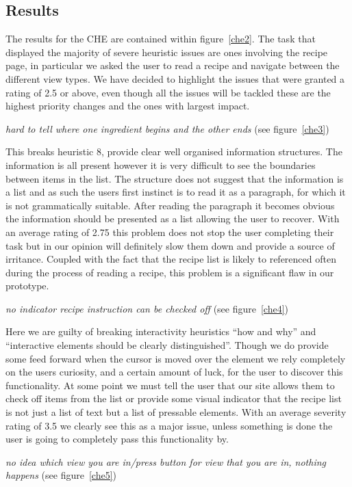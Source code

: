 \subsection{Results}
The results for the CHE are contained within figure~\ref{che2}. The task that displayed the majority of severe heuristic issues are ones involving the recipe page, in particular we asked the user to read a recipe and navigate between the different view types. We have decided to highlight the issues that were granted a rating of 2.5 or above, even though all the issues will be tackled these are the highest priority changes and the ones with largest impact.
\begin{center}
\emph{hard to tell where one ingredient begins and the other ends} (see figure~\ref{che3})
\end{center}
This breaks heuristic 8, provide clear well organised information structures. The information is all present however it is very difficult to see the boundaries between items in the list. The structure does not suggest that the information is a list and as such the users first instinct is to read it as a paragraph, for which it is not grammatically suitable. After reading the paragraph it becomes obvious the information should be presented as a list allowing the user to recover. With an average rating of 2.75 this problem does not stop the user completing their task but in our opinion will definitely slow them down and provide a source of irritance. Coupled with the fact that the recipe list is likely to referenced often during the process of reading a recipe, this problem is a significant flaw in our prototype.
\begin{center}
\emph{no indicator recipe instruction can be checked off} (see figure~\ref{che4})
\end{center}
Here we are guilty of breaking interactivity heuristics “how and why” and “interactive elements should be clearly distinguished”. Though we do provide some feed forward when the cursor is moved over the element we rely completely on the users curiosity, and a certain amount of luck, for the user to discover this functionality. At some point we must tell the user that our site allows them to check off items from the list or provide some visual indicator that the recipe list is not just a list of text but a list of pressable elements. With an average severity rating of 3.5 we clearly see this as a major issue, unless something is done the user is going to completely pass this functionality by.
\begin{center}
\emph{no idea which view you are in/press button for view that you are in, nothing happens} (see figure~\ref{che5})
\end{center}
